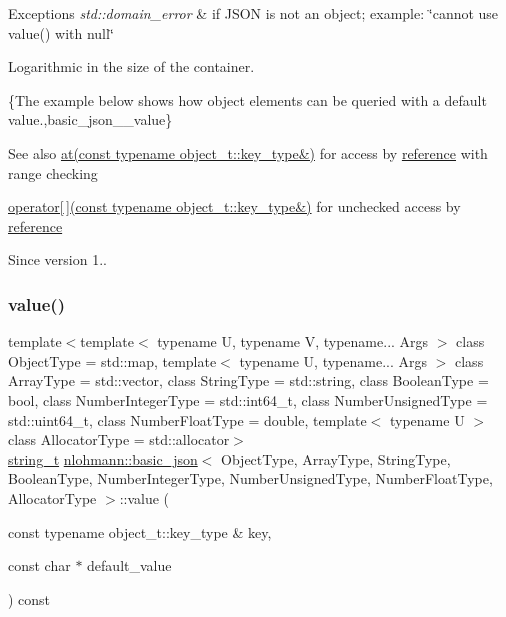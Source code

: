 \begin{DoxyExceptions}{Exceptions}
{\em std\+::domain\+\_\+error} & if J\+S\+ON is not an object; example\+: {\ttfamily \char`\"{}cannot use
value() with null\char`\"{}}\\
\hline
\end{DoxyExceptions}
Logarithmic in the size of the container.

\{The example below shows how object elements can be queried with a default value.,basic\+\_\+json\+\_\+\+\_\+value\}

\begin{DoxySeeAlso}{See also}
\hyperlink{classnlohmann_1_1basic__json_a7ed92d56cb313b243c1917696ffdf074}{at(const typename object\+\_\+t\+::key\+\_\+type\&)} for access by \hyperlink{classnlohmann_1_1basic__json_a3ec8e17be8732fe436e9d6733f52b7a3}{reference} with range checking 

\hyperlink{classnlohmann_1_1basic__json_a92fbb711a36b5ce78ee228b26787c034}{operator\mbox{[}$\,$\mbox{]}(const typename object\+\_\+t\+::key\+\_\+type\&)} for unchecked access by \hyperlink{classnlohmann_1_1basic__json_a3ec8e17be8732fe436e9d6733f52b7a3}{reference}
\end{DoxySeeAlso}
\begin{DoxySince}{Since}
version 1.. 
\end{DoxySince}
\hypertarget{classnlohmann_1_1basic__json_a0491b6739b54dcf83d5e10c4f604ca8f}{}\label{classnlohmann_1_1basic__json_a0491b6739b54dcf83d5e10c4f604ca8f} 
\subsubsection{\texorpdfstring{value()}{value()}\hspace{0.1cm}{\footnotesize\ttfamily [2/4]}}
{\footnotesize\ttfamily template$<$template$<$ typename U, typename V, typename... Args $>$ class Object\+Type = std\+::map, template$<$ typename U, typename... Args $>$ class Array\+Type = std\+::vector, class String\+Type  = std\+::string, class Boolean\+Type  = bool, class Number\+Integer\+Type  = std\+::int64\+\_\+t, class Number\+Unsigned\+Type  = std\+::uint64\+\_\+t, class Number\+Float\+Type  = double, template$<$ typename U $>$ class Allocator\+Type = std\+::allocator$>$ \\
\hyperlink{classnlohmann_1_1basic__json_ab63e618bbb0371042b1bec17f5891f42}{string\+\_\+t} \hyperlink{classnlohmann_1_1basic__json}{nlohmann\+::basic\+\_\+json}$<$ Object\+Type, Array\+Type, String\+Type, Boolean\+Type, Number\+Integer\+Type, Number\+Unsigned\+Type, Number\+Float\+Type, Allocator\+Type $>$\+::value (\begin{DoxyParamCaption}\item[{const typename object\+\_\+t\+::key\+\_\+type \&}]{key,  }\item[{const char $\ast$}]{default\+\_\+value }\end{DoxyParamCaption}) const\hspace{0.3cm}{\ttfamily [inline]}}




